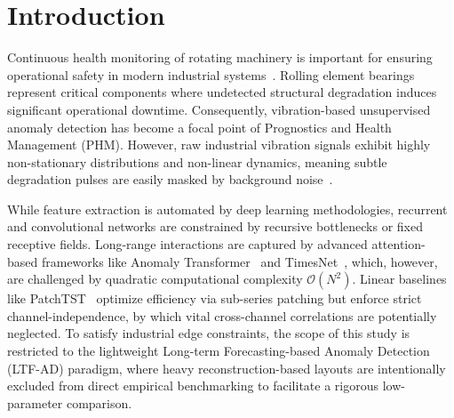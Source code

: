 \documentclass[runningheads]{llncs}
\begin{document}
\section{Introduction} \label{sect:s1}
 Continuous health monitoring of rotating machinery is important for ensuring operational safety in modern industrial systems~\cite{ref-1}. Rolling element bearings represent critical components where undetected structural degradation induces significant operational downtime. Consequently, vibration-based unsupervised anomaly detection has become a focal point of Prognostics and Health Management (PHM). However, raw industrial vibration signals exhibit highly non-stationary distributions and non-linear dynamics, meaning subtle degradation pulses are easily masked by background noise~\cite{ref-1}.

 While feature extraction is automated by deep learning methodologies, recurrent and convolutional networks are constrained by recursive bottlenecks or fixed receptive fields. Long-range interactions are captured by advanced attention-based frameworks like Anomaly Transformer~\cite{ref-2} and TimesNet~\cite{ref-3}, which, however, are challenged by quadratic computational complexity $\mathcal{O}(N^2)$. Linear baselines like PatchTST~\cite{ref-4} optimize efficiency via sub-series patching but enforce strict channel-independence, by which vital cross-channel correlations are potentially neglected. To satisfy industrial edge constraints, the scope of this study is restricted to the lightweight Long-term Forecasting-based Anomaly Detection (LTF-AD) paradigm, where heavy reconstruction-based layouts are intentionally excluded from direct empirical benchmarking to facilitate a rigorous low-parameter comparison.
\end{document}
